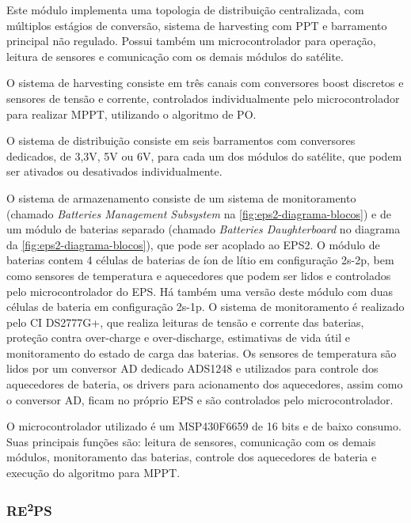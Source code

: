 Este módulo implementa uma topologia de distribuição centralizada, com múltiplos estágios de conversão, sistema de harvesting com \gls{PPT} e barramento principal não regulado.
Possui também um microcontrolador para operação, leitura de sensores e comunicação com os demais módulos do satélite.

O sistema de harvesting consiste em três canais com conversores boost discretos e sensores de tensão e corrente, controlados individualmente pelo microcontrolador para realizar \gls{MPPT}, utilizando o algoritmo de \gls{PO}.

O sistema de distribuição consiste em seis barramentos com conversores dedicados, de 3,3V, 5V ou 6V, para cada um dos módulos do satélite, que podem ser ativados ou desativados individualmente.

O sistema de armazenamento consiste de um sistema de monitoramento (chamado \textit{Batteries Management Subsystem} na \autoref{fig:eps2-diagrama-blocos}) e de um módulo de baterias separado (chamado \textit{Batteries Daughterboard} no diagrama da \autoref{fig:eps2-diagrama-blocos}), que pode ser acoplado ao \gls{EPS2}.
O módulo de baterias contem 4 células de baterias de íon de lítio em configuração 2s-2p, bem como sensores de temperatura e aquecedores que podem ser lidos e controlados pelo microcontrolador do \gls{EPS}.
Há também uma versão deste módulo com duas células de bateria em configuração 2s-1p.
O sistema de monitoramento é realizado pelo \gls{CI} DS2777G+, que realiza leituras de tensão e corrente das baterias, proteção contra over-charge e over-discharge, estimativas de vida útil e monitoramento do estado de carga das baterias.
Os sensores de temperatura são lidos por um conversor \gls{AD} dedicado ADS1248 e utilizados para controle dos aquecedores de bateria, os drivers para acionamento dos aquecedores, assim como o conversor \gls{AD}, ficam no próprio \gls{EPS} e são controlados pelo microcontrolador.

O microcontrolador utilizado é um MSP430F6659 de 16 bits e de baixo consumo.
Suas principais funções são: leitura de sensores, comunicação com os demais módulos, monitoramento das baterias, controle dos aquecedores de bateria e execução do algoritmo para \gls{MPPT}.


\subsubsection{\texorpdfstring{RE\textsuperscript{2}PS}{REEPS}}


